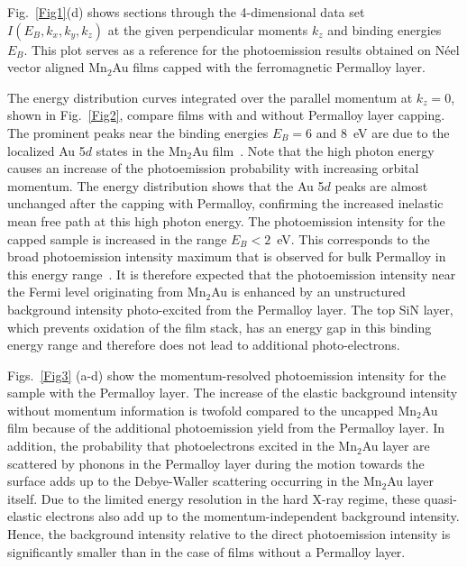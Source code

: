\documentclass[aps,prb,twocolumn,superscriptaddress,10pt]{revtex4-1}
\begin{document}
Fig.~\ref{Fig1}(d) shows sections through the 4-dimensional data set
$I(E_B,k_x,k_y,k_z)$ at the given perpendicular moments $k_z$ and
binding energies $E_B$. This plot serves as a reference
for the photoemission results obtained on N{\'e}el vector aligned Mn$_2$Au films capped with
the ferromagnetic Permalloy layer.


The energy distribution curves integrated over the parallel momentum
at $k_z=0$, shown in Fig.~\ref{Fig2}, compare films with and without
Permalloy layer capping. The prominent peaks near the binding energies
$E_B=6$ and 8~eV are due to the localized Au 5$d$ states in the 
Mn$_2$Au film~\cite{Zuazo2007}. 
Note that the high photon energy causes an increase of the photoemission probability with increasing orbital momentum. 
The energy distribution shows that the Au 5$d$ peaks are almost unchanged
after the capping with Permalloy, confirming the increased inelastic mean free path at this high photon energy.
The photoemission intensity for the capped sample is increased
in the range $E_B<2$~eV. 
This corresponds to the broad photoemission intensity maximum 
that is observed for bulk Permalloy in this energy range~\cite{Altmann1999}.
It is therefore expected that the photoemission intensity near the Fermi level originating from Mn$_2$Au is enhanced by an unstructured background intensity
photo-excited from the Permalloy layer. 
The top SiN layer, which prevents oxidation of the film stack,
has an energy gap in this binding energy range and therefore
does not lead to additional photo-electrons.


Figs.~\ref{Fig3} (a-d) show the momentum-resolved
photoemission intensity for the sample with the Permalloy layer.
The increase of the elastic background intensity without momentum
information is twofold compared to the uncapped Mn$_2$Au film
because of the additional photoemission yield from the Permalloy layer.
In addition, the probability that photoelectrons excited
in the Mn$_2$Au layer are scattered by phonons in the 
Permalloy layer during the motion towards the surface adds up to the Debye-Waller scattering
occurring in the   Mn$_2$Au layer itself.
Due to the limited energy resolution in the hard X-ray regime,
these quasi-elastic electrons also add up to the momentum-independent background intensity. Hence, the background intensity relative to the direct photoemission intensity is significantly smaller than in the case of films without a Permalloy layer.
\end{document}
